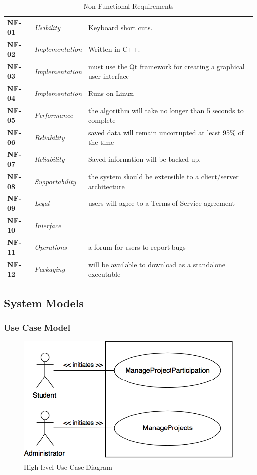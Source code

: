 \documentclass[12pt,letterpaper]{article}
\begin{document}
\begin{table}[H]
\caption{Non-Functional Requirements}
\renewcommand{\arraystretch}{1.5}
\everyrow{\hline}
\begin{tabu} to 
NF-01 & Usability & Keyboard short cuts. \\
NF-02 & Implementation & Written in C++. \\
NF-03 & Implementation & must use the Qt framework for creating a graphical user interface \\
NF-04 & Implementation & Runs on Linux. \\
NF-05 & Performance & the algorithm will take no longer than 5 seconds to complete \\
NF-06 & Reliability & saved data will remain uncorrupted at least 95\% of the time \\
NF-07 & Reliability & Saved information will be backed up. \\
NF-08 & Supportability & the system should be extensible to a client/server architecture \\
NF-09 & Legal & users will agree to a Terms of Service agreement \\
NF-10 & Interface & \\
NF-11 & Operations & a forum for users to report bugs \\
NF-12 & Packaging & will be available to download as a standalone executable \\
\end{tabu}
\end{table}

\subsection{System Models}

\subsubsection{Use Case Model}

\begin{figure}[H]
	\centering{}
	\includegraphics[scale=0.5]{imgs/high-level-use-case.png}
	\caption{High-level Use Case Diagram}
\end{figure}
\end{document}
